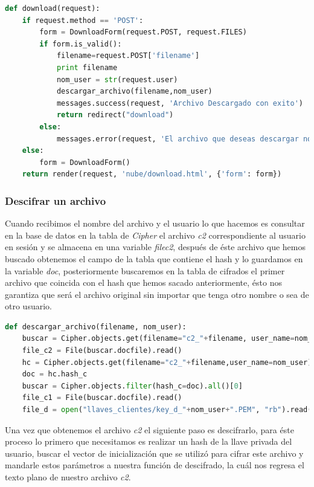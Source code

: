 \begin{lstlisting}[language=Python,frame=single, keywordstyle=\color{blue},breaklines=true, showstringspaces=false]
def download(request):
    if request.method == 'POST':
        form = DownloadForm(request.POST, request.FILES)
        if form.is_valid():
            filename=request.POST['filename']
            print filename
            nom_user = str(request.user)
            descargar_archivo(filename,nom_user)
            messages.success(request, 'Archivo Descargado con exito')
            return redirect("download")
        else:
            messages.error(request, 'El archivo que deseas descargar no existe')
    else:
        form = DownloadForm()
    return render(request, 'nube/download.html', {'form': form})
\end{lstlisting}

\subsubsection{Descifrar un archivo}

Cuando recibimos el nombre del archivo y el usuario lo que hacemos es consultar en la base de datos en la tabla de \textit{Cipher} el archivo \textit{c2} correspondiente al usuario en sesión y se almacena en una variable \textit{filec2}, después de éste archivo que hemos buscado obtenemos el campo de la tabla que contiene el hash y lo guardamos en la variable \textit{doc}, posteriormente buscaremos en la tabla de cifrados el primer archivo que coincida con el hash que hemos sacado anteriormente, ésto nos garantiza que será el archivo original sin importar que tenga otro nombre o sea de otro usuario.

\begin{lstlisting}[language=Python,frame=single, keywordstyle=\color{blue},breaklines=true, showstringspaces=false]
def descargar_archivo(filename, nom_user):
    buscar = Cipher.objects.get(filename="c2_"+filename, user_name=nom_user)
    file_c2 = File(buscar.docfile).read()
    hc = Cipher.objects.get(filename="c2_"+filename,user_name=nom_user)
    doc = hc.hash_c
    buscar = Cipher.objects.filter(hash_c=doc).all()[0]
    file_c1 = File(buscar.docfile).read()
    file_d = open("llaves_clientes/key_d_"+nom_user+".PEM", "rb").read()
\end{lstlisting}

Una vez que obtenemos el archivo \textit{c2} el siguiente paso es descifrarlo, para éste proceso lo primero que necesitamos es realizar un hash de la llave privada del usuario, buscar el vector de inicialización que se utilizó para cifrar este archivo y mandarle estos parámetros a nuestra función de descifrado, la cuál nos regresa el texto plano de nuestro archivo \textit{c2}.

